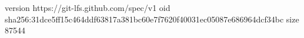 version https://git-lfs.github.com/spec/v1
oid sha256:31dce5ff15c464ddf63817a381bc60e7f7620f40031ec05087e686964dcf34bc
size 87544
